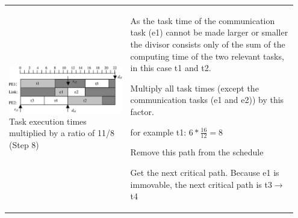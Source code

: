 \begin{longtable}{p{0.4\linewidth}p{0.55\linewidth}}
			\includegraphics[scale=0.35]{./pictures/voltage_scheduling_3.png} \newline
				Task execution times multiplied by a ratio of 11/8 (Step 8)			
			&
				\vspace{-90pt}
				\begin{compactenum}[\ ]
					\item As the task time of the communication task (e1) cannot be made larger or smaller the divisor consists only of the sum of the computing time of the two relevant tasks, in this case t1 and t2.
				\end{compactenum}
				\begin{compactenum}	
					\setcounter{enumi}{4}
					\item Multiply all task times (except the communication tasks (e1 and e2)) by this factor.
					\begin{compactitem}
						\item for example t1: $6*\frac{16}{12}=8$
					\end{compactitem}
					\item Remove this path from the schedule
					\item Get the next critical path. Because e1 is immovable, the next critical path is t3$\rightarrow$t4								
				\end{compactenum}	\\
				

\end{longtable}
